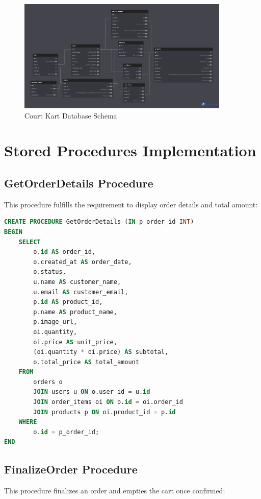 \documentclass{article}
\begin{document}
\begin{figure}[H]
    \centering
    \includegraphics[width=0.9\textwidth]{../public/assets/images/db-schema.png}
    \caption{Court Kart Database Schema}
\end{figure}

\section{Stored Procedures Implementation}

\subsection{GetOrderDetails Procedure}
This procedure fulfills the requirement to display order details and total amount:

\begin{lstlisting}[language=SQL]
CREATE PROCEDURE GetOrderDetails (IN p_order_id INT)
BEGIN
    SELECT
        o.id AS order_id,
        o.created_at AS order_date,
        o.status,
        u.name AS customer_name,
        u.email AS customer_email,
        p.id AS product_id,
        p.name AS product_name,
        p.image_url,
        oi.quantity,
        oi.price AS unit_price,
        (oi.quantity * oi.price) AS subtotal,
        o.total_price AS total_amount
    FROM
        orders o
        JOIN users u ON o.user_id = u.id
        JOIN order_items oi ON o.id = oi.order_id
        JOIN products p ON oi.product_id = p.id
    WHERE
        o.id = p_order_id;
END
\end{lstlisting}

\subsection{FinalizeOrder Procedure}
This procedure finalizes an order and empties the cart once confirmed:
\end{document}
